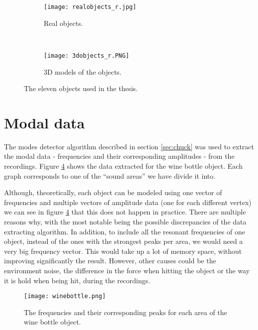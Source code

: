 \begin{figure}[H]
    \centering
    \begin{subfigure}[b]{0.8\textwidth}
        \texttt{[image: realobjects\_r.jpg]}
        \caption{Real objects.}
        \label{fig:real}
    \end{subfigure}
    ~ %
    \begin{subfigure}[b]{0.8\textwidth}
        \texttt{[image: 3dobjects\_r.PNG]}
        \caption{3D models of the objects.}
        \label{fig:models}
    \end{subfigure}
    \caption{The eleven objects used in the thesis.}\label{fig:objects}
\end{figure}

\section{Modal data}
The modes detector algorithm described in section \ref{sec:chuck} was used to extract the modal data - frequencies and their corresponding amplitudes - from the recordings. Figure \ref{fig:bottle_data} shows the data extracted for the wine bottle object. Each graph corresponds to one of the ``sound areas'' we have divide it into.


Although, theoretically, each object can be modeled using one vector of frequencies and multiple vectors of amplitude data (one for each different vertex) we can see in figure \ref{fig:bottle_data} that this does not happen in practice. There are multiple reasons why, with the most notable being the possible discrepancies of the data extracting algorithm. In addition, to include all the resonant frequencies of one object, instead of the ones with the strongest peaks per area, we would need a very big frequency vector. This would take up a lot of memory space, without improving significantly the result. However, other causes could be the environment noise, the difference in the force when hitting the object or the way it is hold when being hit, during the recordings.


\begin{figure}[H]
  \centering
    \texttt{[image: winebottle.png]}
      \caption{The frequencies and their corresponding peaks for each area of the wine bottle object.}\label{fig:bottle_data}
\end{figure}

